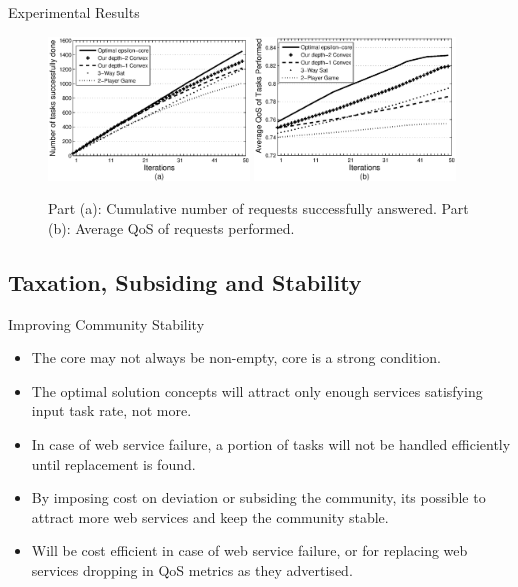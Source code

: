 \documentclass{beamer}
\begin{document}
\begin{frame}{Experimental Results}

    \begin{figure}[!t]
    \centering
    \includegraphics[width=2.1in]{figures/task_done_opt.eps}
    \includegraphics[width=2.1in]{figures/task_qos_opt.eps}
    \caption{Part (a): Cumulative number of requests successfully
    answered. Part (b): Average QoS of requests performed.}
    \label{performanceall}
    \end{figure}

\end{frame}

\subsection{Taxation, Subsiding and Stability}
\begin{frame}{Improving Community Stability}
    \begin{itemize}
        \item The core may not always be non-empty, core is a strong condition.
        \item The optimal solution concepts will attract only enough services satisfying input task rate, not more.
        \item In case of web service failure, a portion of tasks will not be handled efficiently until replacement is found.
        \item By imposing cost on deviation or subsiding the community, its possible to attract more web services and keep the community stable.
        \item Will be cost efficient in case of web service failure, or for replacing web services dropping in QoS metrics as they advertised.                
    \end{itemize}
\end{frame}
\end{document}
